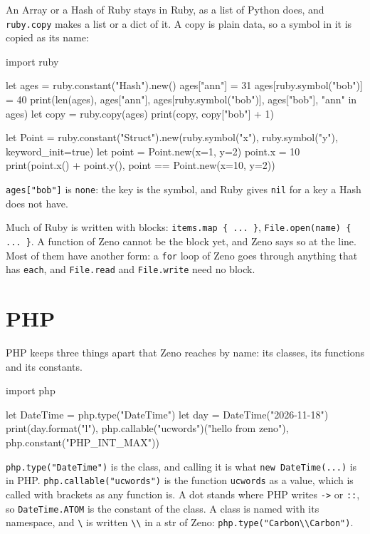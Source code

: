 An Array or a Hash of Ruby stays in Ruby, as a list of Python does,
and \verb|ruby.copy| makes a list or a dict of it. A copy is plain
data, so a symbol in it is copied as its name:

\begin{zeno}[file=ages.zeno, dir=ruby]
import ruby

let ages = ruby.constant("Hash").new()
ages["ann"] = 31
ages[ruby.symbol("bob")] = 40
print(len(ages), ages["ann"], ages[ruby.symbol("bob")], ages["bob"], "ann" in ages)
let copy = ruby.copy(ages)
print(copy, copy["bob"] + 1)

let Point = ruby.constant("Struct").new(ruby.symbol("x"), ruby.symbol("y"), keyword_init=true)
let point = Point.new(x=1, y=2)
point.x = 10
print(point.x() + point.y(), point == Point.new(x=10, y=2))
\end{zeno}

\verb|ages["bob"]| is \verb|none|: the key is the symbol, and Ruby
gives \verb|nil| for a key a Hash does not have.

\begin{note}
Much of Ruby is written with blocks: \verb|items.map { ... }|,
\verb|File.open(name) { ... }|. A function of Zeno cannot be the block
yet, and Zeno says so at the line. Most of them have another form: a
\verb|for| loop of Zeno goes through anything that has \verb|each|,
and \verb|File.read| and \verb|File.write| need no block.
\end{note}

\section{PHP}

PHP keeps three things apart that Zeno reaches by name: its classes,
its functions and its constants.

\begin{zeno}[file=date.zeno, dir=php]
import php

let DateTime = php.type("DateTime")
let day = DateTime("2026-11-18")
print(day.format("l"), php.callable("ucwords")("hello from zeno"), php.constant("PHP_INT_MAX"))
\end{zeno}

\verb|php.type("DateTime")| is the class, and calling it is what
\verb|new DateTime(...)| is in PHP. \verb|php.callable("ucwords")| is
the function \verb|ucwords| as a value, which is called with brackets
as any function is. A dot stands where PHP writes \verb|->| or
\verb|::|, so \verb|DateTime.ATOM| is the constant of the class. A
class is named with its namespace, and \verb|\| is written \verb|\\|
in a str of Zeno: \verb|php.type("Carbon\\Carbon")|.

